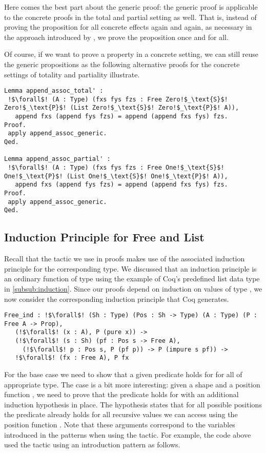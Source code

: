 Here comes the best part about the generic proof: the generic proof is applicable to the concrete proofs in the total and partial setting as well.
That is, instead of proving the proposition for all concrete effects again and again, as necessary in the approach introduced by \citet{abel2005verifying}, we prove the proposition once and for all.

Of course, if we want to prove a property in a concrete setting, we can still reuse the generic propositions as the following alternative proofs for the concrete settings of totality and partiality illustrate.

\begin{verbatim}
Lemma append_assoc_total' :
 !$\forall$! (A : Type) (fxs fys fzs : Free Zero!$_\text{S}$! Zero!$_\text{P}$! (List Zero!$_\text{S}$! Zero!$_\text{P}$! A)),
   append fxs (append fys fzs) = append (append fxs fys) fzs.
Proof.
 apply append_assoc_generic.
Qed.

Lemma append_assoc_partial' :
 !$\forall$! (A : Type) (fxs fys fzs : Free One!$_\text{S}$! One!$_\text{P}$! (List One!$_\text{S}$! One!$_\text{P}$! A)),
   append fxs (append fys fzs) = append (append fxs fys) fzs.
Proof.
 apply append_assoc_generic.
Qed.
\end{verbatim}

\subsection{Induction Principle for Free and List}

Recall that the  tactic we use in proofs makes use of the associated induction principle for the corresponding type.
We discussed that an induction principle is an ordinary function of type  using the example of Coq's predefined list data type in \autoref{subsub:induction}.
Since our proofs depend on induction on values of type , we now consider the corresponding induction principle that Coq generates.

\begin{verbatim}
Free_ind : !$\forall$! (Sh : Type) (Pos : Sh -> Type) (A : Type) (P : Free A -> Prop),
   (!$\forall$! (x : A), P (pure x)) ->
   (!$\forall$! (s : Sh) (pf : Pos s -> Free A),
     (!$\forall$! p : Pos s, P (pf p)) -> P (impure s pf)) ->
   !$\forall$! (fx : Free A), P fx
\end{verbatim}

For the base case we need to show that a given predicate  holds for  for all  of appropriate type.
The  case is a bit more interesting: given a shape  and a position function , we need to prove that the predicate holds for  with an additional induction hypothesis in place.
The hypothesis states that for all possible positions  the predicate already holds for all recursive values we can access using the position function .
Note that these arguments correspond to the variables introduced in the patterns when using the  tactic.
For example, the code above used the tactic using an introduction pattern as follows.

